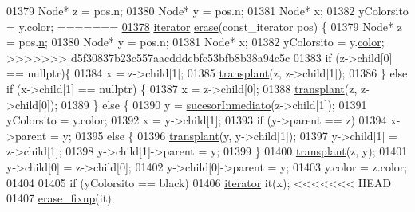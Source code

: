 \begin{DoxyCode}
01379         Node* z = pos.n;
01380         Node* y = pos.n;
01381         Node* x;
01382         yColorsito = y.color;
=======
\hyperlink{classaed2_1_1map_ad8e796bf9c9c558e5ce6b61e116253fe_ad8e796bf9c9c558e5ce6b61e116253fe}{01378}     \hyperlink{classaed2_1_1iterator}{iterator} \hyperlink{classaed2_1_1map_ad8e796bf9c9c558e5ce6b61e116253fe_ad8e796bf9c9c558e5ce6b61e116253fe}{erase}(const\_iterator pos) \{
01379         Node* z = pos.\hyperlink{classaed2_1_1map_1_1iterator_a1eb67290cc33d9739e0efaf02bbdab9f_a1eb67290cc33d9739e0efaf02bbdab9f}{n};
01380         Node* y = pos.n;
01381         Node* x;
01382         yColorsito = y.\hyperlink{structaed2_1_1map_1_1Node_a58dd9993fee8ee3eaa5716b72a3eca47_a58dd9993fee8ee3eaa5716b72a3eca47}{color};
>>>>>>> d5f30837b23c557aacdddcbfc53bfb8b38a94c5c
01383         \textcolor{keywordflow}{if} (z->child[0] == \textcolor{keyword}{nullptr})\{
01384             x = z->child[1];
01385             \hyperlink{classaed2_1_1map_a98b9f200c64ce02dfb67902ee00e375a_a98b9f200c64ce02dfb67902ee00e375a}{transplant}(z, z->child[1]);
01386         \} \textcolor{keywordflow}{else} \textcolor{keywordflow}{if} (x->child[1] == \textcolor{keyword}{nullptr}) \{
01387             x = z->child[0];
01388             \hyperlink{classaed2_1_1map_a98b9f200c64ce02dfb67902ee00e375a_a98b9f200c64ce02dfb67902ee00e375a}{transplant}(z, z->child[0]);
01389         \} \textcolor{keywordflow}{else} \{
01390             y = \hyperlink{classaed2_1_1map_a51169c7d557dc5cf26eac59e6e5e6d98_a51169c7d557dc5cf26eac59e6e5e6d98}{sucesorInmediato}(z->child[1]);
01391             yColorsito = y.color;
01392             x = y->child[1];
01393             \textcolor{keywordflow}{if} (y->parent == z)
01394                 x->parent = y;
01395             \textcolor{keywordflow}{else} \{
01396                 \hyperlink{classaed2_1_1map_a98b9f200c64ce02dfb67902ee00e375a_a98b9f200c64ce02dfb67902ee00e375a}{transplant}(y, y->child[1]);
01397                 y->child[1] = z->child[1];
01398                 y->child[1]->parent = y;
01399             \}
01400             \hyperlink{classaed2_1_1map_a98b9f200c64ce02dfb67902ee00e375a_a98b9f200c64ce02dfb67902ee00e375a}{transplant}(z, y);
01401             y->child[0] = z->child[0];
01402             y->child[0]->parent = y;
01403             y.color = z.color;
01404 
01405             \textcolor{keywordflow}{if} (yColorsito == black)
01406                 \hyperlink{classaed2_1_1iterator}{iterator} it(x);
<<<<<<< HEAD
01407                 \hyperlink{classaed2_1_1map_a7870c8f26e82b00d0aeb2e9f331dfec6_a7870c8f26e82b00d0aeb2e9f331dfec6}{erase_fixup}(it);

\end{DoxyCode}
